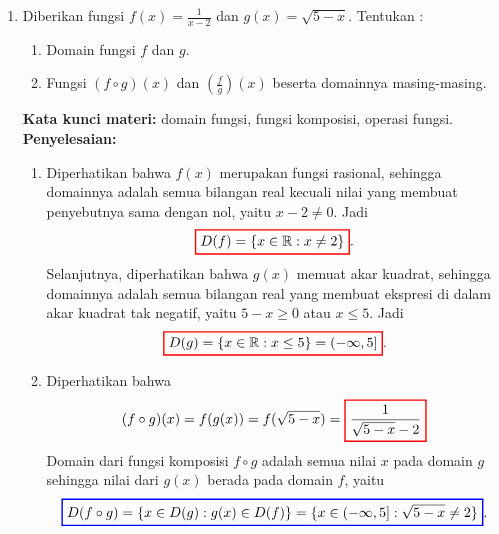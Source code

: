 \documentclass[10pt,openany,a4paper]{article}
\theoremstyle{definition}
\theoremstyle{definition}
\theoremstyle{plain}
\newenvironment{jawab}[2][tes]{%
\par\noindent\textbf{Kata kunci materi:} #1.\\
\textbf{Penyelesaian:} #2%
}{}
\begin{document}
\begin{enumerate}
            \item Diberikan fungsi $f(x)=\frac{1}{x-2}$ dan $g(x)=\sqrt{5-x}$. Tentukan :
            \begin{enumerate}
                \item Domain fungsi $f$ dan $g$.
                \item Fungsi $(f\circ g)(x)$ dan $\left(\frac{f}{g}\right) (x)$ beserta domainnya masing-masing.
            \end{enumerate}
            \begin{jawab}[domain fungsi, fungsi komposisi, operasi fungsi]{
                \begin{enumerate}
                    \item Diperhatikan bahwa $f(x)$ merupakan fungsi rasional, sehingga domainnya adalah semua bilangan real kecuali nilai yang membuat penyebutnya sama dengan nol, yaitu $x-2\neq 0$. Jadi
                    \[
                    \colorlet{oldcolor}{.}
        \color{red}
        \setlength{\fboxrule}{1pt} \boxed{\color{oldcolor}D(f)=\{x \in \mathbb{R} : x \neq 2\}}\color{oldcolor}.
                    \]
                    Selanjutnya, diperhatikan bahwa $g(x)$ memuat akar kuadrat, sehingga domainnya adalah semua bilangan real yang membuat ekspresi di dalam akar kuadrat tak negatif, yaitu $5-x\geq 0$ atau $x\leq 5$. Jadi
                    \[
                    \colorlet{oldcolor}{.}
        \color{red}
        \setlength{\fboxrule}{1pt} \boxed{\color{oldcolor}D(g)=\{x \in \mathbb{R} : x \leq 5\} = (-\infty,5]}\color{oldcolor}.
                    \]
                    \item Diperhatikan bahwa
                    \begin{align*}
                        (f\circ g)(x) = f(g(x)) = f(\sqrt{5-x}) = \colorlet{oldcolor}{.}
        \color{red}
        \setlength{\fboxrule}{1pt} \boxed{\color{oldcolor}\frac{1}{\sqrt{5-x} - 2}}\color{oldcolor}
                    \end{align*}
                    Domain dari fungsi komposisi $f\circ g$ adalah semua nilai $x$ pada domain $g$ sehingga nilai dari $g(x)$ berada pada domain $f$, yaitu
                    \begin{align*}
                        \colorlet{oldcolor}{.}
        \color{blue}
        \setlength{\fboxrule}{1pt} \boxed{\color{oldcolor}D(f\circ g) = \{x \in D(g) : g(x) \in D(f)\} = \{x \in (-\infty, 5] : \sqrt{5-x} \neq 2\}}\color{oldcolor}.
                    \end{align*}

\end{enumerate}}
\end{jawab}
\end{enumerate}
\end{document}
